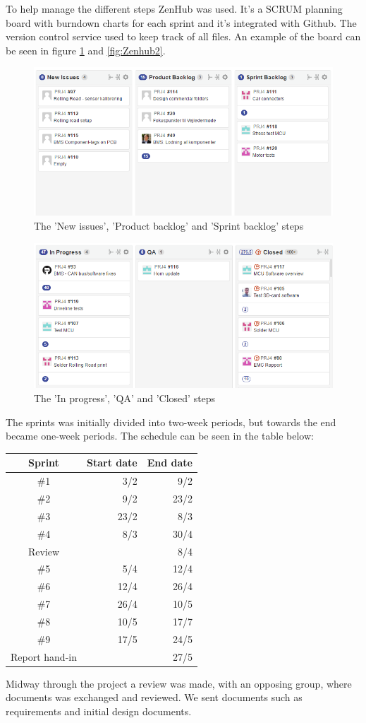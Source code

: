 To help manage the different steps ZenHub\cite{Zenhub} was used. It's a SCRUM planning board with burndown charts for each sprint and it's integrated with Github\cite{Github}. The version control service used to keep track of all files. An example of the board can be seen in figure \ref{fig:Zenhub1} and \vref{fig:Zenhub2}.

\begin{figure}
	\centering
	\includegraphics[width=0.7\linewidth]{SubPages/Images/Zenhub1}
	\caption{The 'New issues', 'Product backlog' and 'Sprint backlog' steps}
	\label{fig:Zenhub1}
\end{figure}

\begin{figure}
	\centering
	\includegraphics[width=0.7\linewidth]{SubPages/Images/Zenhub2}
	\caption{The 'In progress', 'QA' and 'Closed' steps}
	\label{fig:Zenhub2}
\end{figure}

The sprints was initially divided into two-week periods, but towards the end became one-week periods. The schedule can be seen in the table below:

\begin{tabular}{|c|r|r|}
	\hline \textbf{Sprint} & \textbf{Start date} & \textbf{End date} \\ 
	\hline \#1 & 3/2 & 9/2 \\ 
	\hline \#2 & 9/2 & 23/2 \\ 
	\hline \#3 & 23/2 & 8/3 \\ 
	\hline \#4 & 8/3 & 30/4 \\ 
	\hline Review & & 8/4 \\
	\hline \#5 & 5/4 & 12/4 \\ 
	\hline \#6 & 12/4 & 26/4 \\ 
	\hline \#7 & 26/4 & 10/5 \\ 
	\hline \#8 & 10/5 & 17/7 \\ 
	\hline \#9 & 17/5 & 24/5 \\ 
	\hline Report hand-in &  & 27/5 \\ 
	\hline 
\end{tabular} 

Midway through the project a review was made, with an opposing group, where documents was exchanged and reviewed. We sent documents such as requirements and initial design documents.